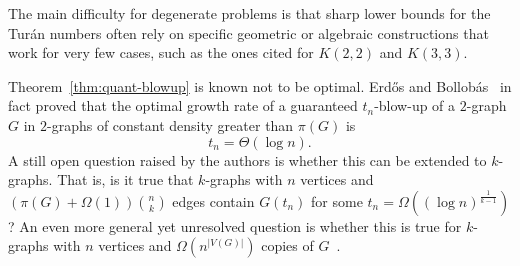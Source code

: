 The main difficulty for degenerate problems is that sharp lower bounds for the Turán numbers
often rely on specific geometric or algebraic constructions that work for very few cases,
such as the ones cited for $K(2, 2)$ and $K(3, 3)$.

Theorem~\ref{thm:quant-blowup} is known not to be optimal.
Erdős and Bollobás~\cite{bollobas1973structure} in fact proved that the optimal growth
rate of a guaranteed $t_n$-blow-up of a $2$-graph $G$ in $2$-graphs of constant density greater than $\pi(G)$ is
\[
    t_n = \Theta (\log n).
\]
A still open question raised by the authors is whether this can be extended to $k$-graphs.
That is, is it true that $k$-graphs with $n$ vertices and  $\left(\pi(G) + \Omega(1) \right)  \binom{n}{k}$ edges
contain $G(t_n)$ for some $t_n = \Omega \left((\log n)^{\frac{1}{k-1}}\right)$?
An even more general yet unresolved question is whether this is true for
$k$-graphs with $n$ vertices and $\Omega (n^{|V(G)|})$ copies of $G$~\cite{rodl2012complete}.